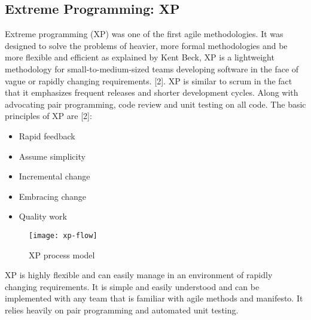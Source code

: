 \subsection{Extreme Programming: XP}

Extreme programming (XP) was one of the first agile methodologies. It was designed to solve the problems of heavier, more formal methodologies and be more flexible and efficient as explained by Kent Beck, XP is a lightweight methodology for small-to-medium-sized teams developing software in the face of vague or rapidly changing requirements. [2]. XP is similar to scrum in the fact that it emphasizes frequent releases and shorter development cycles. Along with advocating pair programming, code review and unit testing on all code. The basic principles of XP are [2]:
\begin{itemize}
\item Rapid feedback
\item Assume simplicity
\item Incremental change
\item Embracing change
\item Quality work
\end{itemize}

\begin{figure}[h]
\centering
\texttt{[image: xp-flow]}
\caption{XP process model}
\end{figure}

XP is highly flexible and can easily manage in an environment of rapidly changing requirements. It is simple and easily understood and can be implemented with any team that is familiar with agile methods and manifesto. It relies heavily on pair programming and automated unit testing.